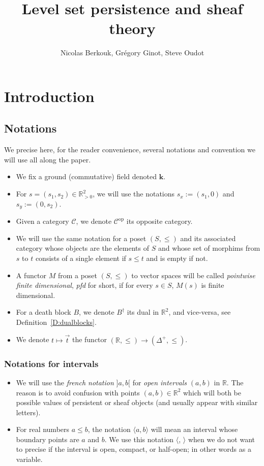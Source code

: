 \documentclass[a4paper, english, 11pt]{article}
\author{Nicolas Berkouk, Grégory Ginot, Steve Oudot}
\newcommand{\kk}[0]{\textbf{k}}
\newcommand{\0}{\vec{0}}
\newcommand{\R}[0]{\mathbb{R}}
\newcommand{\C}[0]{\mathcal{C}}
\newcommand{\op}[0]{\text{op}}
\begin{document}

\title{Level set persistence and sheaf theory}
\maketitle
\begin{abstract}
   
\end{abstract}

\tableofcontents

\section{Introduction}

\subsection{Notations}
We precise here, for the reader convenience, several notations and convention we will use all along the paper.
\begin{itemize}
\item We fix a ground (commutative) field denoted $\kk$.
    \item For $s=(s_1,s_2)\in \R^2_{>0}$, we will use the notations $s_x:=(s_1,0)$ and $s_y := (0,s_2)$.
    \item Given a category $\C$, we denote $\C^{\op}$ its opposite category. 
    \item We will use the same notation for a poset $(S, \leq)$ and its associated  category whose objects are the elements of $S$ and whose set of morphims from  $s$ to $t$ consists of a single element if $s\leq t$ and is empty if not.
    \item A functor $M$ from a poset $(S, \leq)$ to vector spaces will be called \emph{pointwise finite dimensional}, \emph{pfd} for short, if for every $s\in S$, $M(s)$ is finite dimensional. 
    \item For a death block $B$, we denote $B^\dag$ its dual  in $\R^2$, and vice-versa, see Definition~\ref{D:dualblocks}.
    \item We denote $t\mapsto \vec{t}$ the functor $(\R ,\leq) \to (\Delta^+, \leq)$.
\end{itemize}
\subsubsection{Notations for  intervals} 
\begin{itemize} \item We will use the \emph{french notation} $]a,b[$ for \emph{open intervals} $(a,b)$ in $\R$. The reason is to avoid confusion with points $(a,b)\in \R^2$ which will both be possible values of persistent or sheaf objects (and usually appear with similar letters).
    
\item For real numbers $a\leq b$, the notation $\langle a, b\rangle$ will mean an  interval whose boundary points are $a$ and $b$. We use this notation $\langle$, $\rangle$  when we do not want to precise if the interval is open, compact, or half-open; in other words as a variable.
    \end{itemize}
\end{document}
